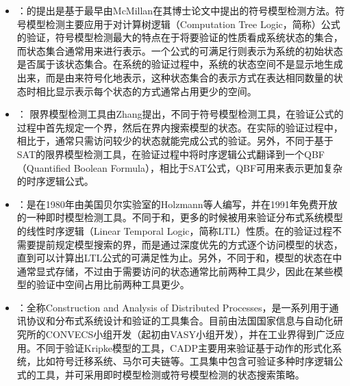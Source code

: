 \begin{itemize}
	\item \nusmv{}：\nusmv{}的提出是基于最早由McMillan在其博士论文\cite{mcmillan93}中提出的符号模型检测方法。符号模型检测主要应用于对计算树逻辑（Computation Tree Logic，简称\CTL{}）公式的验证，符号模型检测最大的特点在于将要验证的性质看成系统状态的集合，而状态集合通常用\BDD{}\cite{Bryant86}来进行表示。一个\CTL{}公式的可满足行则表示为系统的初始状态是否属于该状态集合。在系统的验证过程中，系统的状态空间不是显示地生成出来，而是由\BDD{}来符号化地表示，这种状态集合的表示方式在表达相同数量的状态时相比显示表示每个状态的方式通常占用更少的空间。
	\item \verds{}：
	限界模型检测工具\verds{}由Zhang\cite{Zhang14}提出，不同于符号模型检测工具，\verds{}在验证公式的过程中首先规定一个界，然后在界内搜索模型的状态。在实际的验证过程中，相比于\nusmv{}，\verds{}通常只需访问较少的状态就能完成公式的验证。另外，不同于基于\textsf{SAT}\cite{BCCZ99}的限界模型检测工具，\verds{}在验证过程中将时序逻辑公式翻译到一个\textsf{QBF}（Quantified Boolean Formula），相比于\textsf{SAT}公式，\textsf{QBF}可用来表示更加复杂的时序逻辑公式。
	\item {}：是在1980年由美国贝尔实验室的Holzmann等人编写，并在1991年免费开放的一种即时模型检测工具。不同于\nusmv{}和\verds{}，更多的时候被用来验证分布式系统模型的线性时序逻辑（Linear Temporal Logic，简称\textsf{LTL}）性质。在的验证过程不需要提前规定模型搜索的界，而是通过深度优先的方式逐个访问模型的状态，直到可以计算出\textsf{LTL}公式的可满足性为止。另外，不同于\nusmv{}和\verds{}，模型的状态在中通常显式存储，不过由于需要访问的状态通常比前两种工具少，因此在某些模型的验证中空间占用比前两种工具更少。
	\item {}：全称Construction and Analysis of Distributed Processes，是一系列用于通讯协议和分布式系统设计和验证的工具集合。目前由法国国家信息与自动化研究所的\textsf{CONVECS}小组开发（起初由\textsf{VASY}小组开发），并在工业界得到广泛应用。不同于验证Kripke模型的工具，\textsf{CADP}主要用来验证基于动作的形式化系统，比如符号迁移系统、马尔可夫链等。\CADP{}工具集中包含可验证多种时序逻辑公式的工具，并可采用即时模型检测或符号模型检测的状态搜索策略。
\end{itemize}



